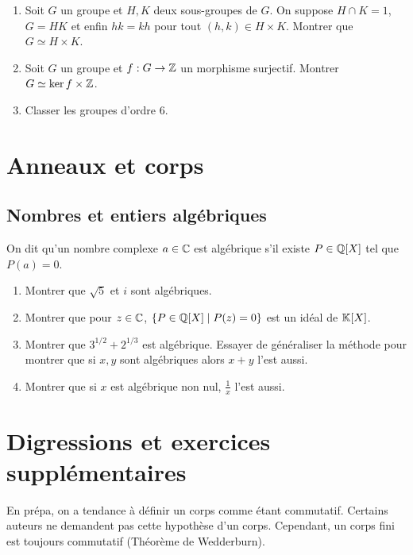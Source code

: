\documentclass[12pt,a4paper]{exo_book}
\begin{document}
\begin{exo}
    \begin{enumerate}
        \item Soit $G$ un groupe et $H, K$ deux sous-groupes de $G$. On suppose $H\cap K = 1$, $G = HK$ et enfin $hk = kh$ pour tout $(h,k)\in H\times K$. Montrer que $G\simeq H\times K$.
        \item Soit $G$ un groupe et $f : G\to \mathbb{Z}$ un morphisme surjectif. Montrer $G \simeq \ker f \times \mathbb{Z}$.
        \item Classer les groupes d'ordre $6$.
    \end{enumerate}
\end{exo}



\section{Anneaux et corps}

\subsection{Nombres et entiers algébriques}

On dit qu'un nombre complexe $a \in \mathbb{C}$ est algébrique s'il existe $P \in \mathbb{Q} [X]$ tel que $P(a) = 0$.

\begin{exo}
    \begin{enumerate}
        \item Montrer que $\sqrt{5}$ et $i$ sont algébriques.
        \item Montrer que pour $z \in \mathbb{C}$, $\{P \in \mathbb{Q} [X] \mid P(z) = 0\}$ est un idéal de $\mathbb{K} [X]$.
        \item Montrer que $3^{1/2} + 2^{1/3}$ est algébrique. Essayer de généraliser la méthode pour montrer que si $x,y$ sont algébriques alors $x+y$ l'est aussi.
        \item Montrer que si $x$ est algébrique non nul, $\frac{1}{x}$ l'est aussi.
    \end{enumerate}
\end{exo}

\section{Digressions et exercices supplémentaires}

En prépa, on a tendance à définir un corps comme étant commutatif. Certains auteurs ne demandent pas cette hypothèse d'un corps. Cependant, un corps fini est toujours commutatif (Théorème de Wedderburn).
\end{document}
